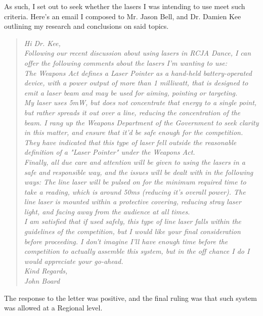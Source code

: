 				As such, I set out to seek whether the lasers I was intending to use meet such criteria. Here's an email I composed to Mr. Jason Bell, and Dr. Damien Kee outlining my research and conclusions on said topics.\\
				
				\pagebreak
                
				
				\begin{quote}
					{\itshape
					Hi Dr. Kee,\\
						
					Following our recent discussion about using lasers in RCJA Dance, I can offer the following comments about the lasers I'm wanting to use:\\
					
					The Weapons Act defines a Laser Pointer as a hand-held battery-operated device, with a power output of more than 1 milliwatt, that is designed to emit a laser beam and may be used for aiming, pointing or targeting.\\
                    
					My laser uses 5mW, but does not concentrate that energy to a single point, but rather spreads it out over a line, reducing the concentration of the beam. I rang up the Weapons Department of the Government to seek clarity in this matter, and ensure that it'd be safe enough for the competition. They have indicated that this type of laser fell outside the reasonable definition of a "Laser Pointer" under the Weapons Act.\\
					
					Finally, all due care and attention will be given to using the lasers in a safe and responsible way, and the issues will be dealt with in the following ways: The line laser will be pulsed on for the minimum required time to take a reading, which is around 50ms (reducing it's overall power). The line laser is mounted within a protective covering, reducing stray laser light, and facing away from the audience at all times.\\
					
					I am satisfied that if used safely, this type of line laser falls within the guidelines of the competition, but I would like your final consideration before proceeding. I don't imagine I'll have enough time before the competition to actually assemble this system, but in the off chance I do I would appreciate your go-ahead.\\
					
					Kind Regards,\\					
					John Board}
				\end{quote}	
				\pagebreak
				
				The response to the letter was positive, and the final ruling was that such system was allowed at a Regional level.